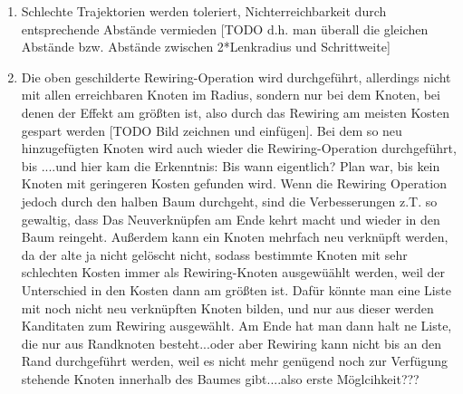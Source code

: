 \begin{enumerate}
	\item Schlechte Trajektorien werden toleriert, Nichterreichbarkeit durch entsprechende Abstände vermieden [TODO d.h. man überall die gleichen Abstände bzw. Abstände zwischen 2*Lenkradius und Schrittweite]
	\item Die oben geschilderte Rewiring-Operation wird durchgeführt, allerdings nicht mit allen erreichbaren Knoten im Radius, sondern nur bei dem Knoten, bei denen der Effekt am größten ist, also durch das Rewiring am meisten Kosten gespart werden [TODO Bild zeichnen und einfügen]. Bei dem so neu hinzugefügten Knoten wird auch wieder die Rewiring-Operation durchgeführt, bis ....und hier kam die Erkenntnis: Bis wann eigentlich? Plan war, bis kein Knoten mit geringeren Kosten gefunden wird. Wenn die Rewiring Operation jedoch durch den halben Baum durchgeht, sind die Verbesserungen z.T. so gewaltig, dass Das Neuverknüpfen am Ende kehrt macht und wieder in den Baum reingeht. Außerdem kann ein Knoten mehrfach neu verknüpft werden, da der alte ja nicht gelöscht nicht, sodass bestimmte Knoten mit sehr schlechten Kosten immer als Rewiring-Knoten ausgewüählt werden, weil der Unterschied in den Kosten dann am größten ist. Dafür könnte man eine Liste mit noch nicht neu verknüpften Knoten bilden, und nur aus dieser werden Kanditaten zum Rewiring ausgewählt. Am Ende hat man dann halt ne Liste, die nur aus Randknoten besteht...oder aber Rewiring kann nicht bis an den Rand durchgeführt werden, weil es nicht mehr genügend noch zur Verfügung stehende Knoten innerhalb des Baumes gibt....also erste Möglcihkeit??? 
\end{enumerate}


